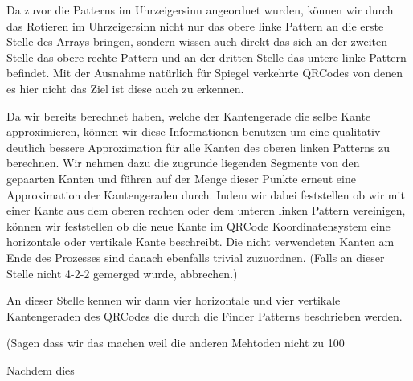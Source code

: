 Da zuvor die Patterns im Uhrzeigersinn angeordnet wurden, können wir durch das Rotieren im Uhrzeigersinn nicht nur das obere linke Pattern an die erste Stelle des Arrays bringen, sondern wissen auch direkt das sich an der zweiten Stelle das obere rechte Pattern und an der dritten Stelle das untere linke Pattern befindet. Mit der Ausnahme natürlich für Spiegel verkehrte QRCodes von denen es hier nicht das Ziel ist diese auch zu erkennen.

Da wir bereits berechnet haben, welche der Kantengerade die selbe Kante approximieren, können wir diese Informationen benutzen um eine qualitativ deutlich bessere Approximation für alle Kanten des oberen linken Patterns zu berechnen. Wir nehmen dazu die zugrunde liegenden Segmente von den gepaarten Kanten und führen auf der Menge dieser Punkte erneut eine Approximation der Kantengeraden durch. Indem wir dabei feststellen ob wir mit einer Kante aus dem oberen rechten oder dem unteren linken Pattern vereinigen, können wir feststellen ob die neue Kante im QRCode Koordinatensystem eine horizontale oder vertikale Kante beschreibt. Die nicht verwendeten Kanten am Ende des Prozesses sind danach ebenfalls trivial zuzuordnen. (Falls an dieser Stelle nicht 4-2-2 gemerged wurde, abbrechen.)

An dieser Stelle kennen wir dann vier horizontale und vier vertikale Kantengeraden des QRCodes die durch die Finder Patterns beschrieben werden.

(Sagen dass wir das machen weil die anderen Mehtoden nicht zu 100%

Nachdem dies